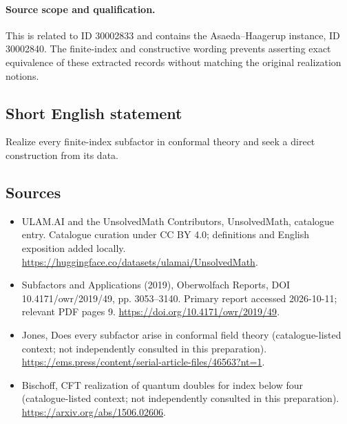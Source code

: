 \documentclass[11pt]{article}
\begin{document}
\paragraph{Source scope and qualification.}
This is related to ID 30002833 and contains the Asaeda--Haagerup instance, ID 30002840. The finite-index and constructive wording prevents asserting exact equivalence of these extracted records without matching the original realization notions.
\subsection{Short English statement}
Realize every finite-index subfactor in conformal theory and seek a direct construction from its data.
\subsection{Sources}
\begin{itemize}
\item[\hypertarget{source:statement:1}{S1}] ULAM.AI and the UnsolvedMath Contributors, UnsolvedMath, catalogue entry. Catalogue curation under CC BY 4.0; definitions and English exposition added locally.
\url{https://huggingface.co/datasets/ulamai/UnsolvedMath}.
\item[\hypertarget{source:statement:2}{S2}] Subfactors and Applications (2019), Oberwolfach Reports, DOI 10.4171/owr/2019/49, pp. 3053--3140. Primary report accessed 2026-10-11; relevant PDF pages 9.
\url{https://doi.org/10.4171/owr/2019/49}.
\item[\hypertarget{source:statement:3}{S3}] Jones, Does every subfactor arise in conformal field theory (catalogue-listed context; not independently consulted in this preparation).
\url{https://ems.press/content/serial-article-files/46563?nt=1}.
\item[\hypertarget{source:statement:4}{S4}] Bischoff, CFT realization of quantum doubles for index below four (catalogue-listed context; not independently consulted in this preparation).
\url{https://arxiv.org/abs/1506.02606}.
\end{itemize}
\label{end:statement}
\end{document}
